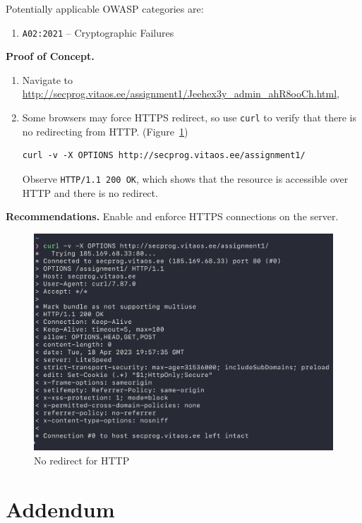 \documentclass[parskip=half]{scrartcl}
\newcommand{\figref}[1]{Figure~\ref{#1}}
\begin{document}
Potentially applicable OWASP categories are:
\begin{enumerate}
  \item \texttt{A02:2021} -- Cryptographic Failures%
\end{enumerate}

\textbf{Proof of Concept.}

\begin{enumerate}
  \item Navigate to\\
  \url{http://secprog.vitaos.ee/assignment1/Jeehex3y_admin_ahR8ooCh.html},
  \item Some browsers may force HTTPS redirect, so use \texttt{curl} to verify
  that there is no redirecting from HTTP. (\figref{fig:http})
\begin{verbatim}
curl -v -X OPTIONS http://secprog.vitaos.ee/assignment1/
\end{verbatim}
  Observe \texttt{HTTP/1.1 200 OK}, which shows that the resource is accessible
  over HTTP and there is no redirect.
\end{enumerate}

\textbf{Recommendations.} Enable and enforce HTTPS connections on the server.

\begin{figure}
  \centering
  \includegraphics[width=\textwidth]{http}
  \caption{No redirect for HTTP}
  \label{fig:http}
\end{figure}

\section*{Addendum}
\end{document}
